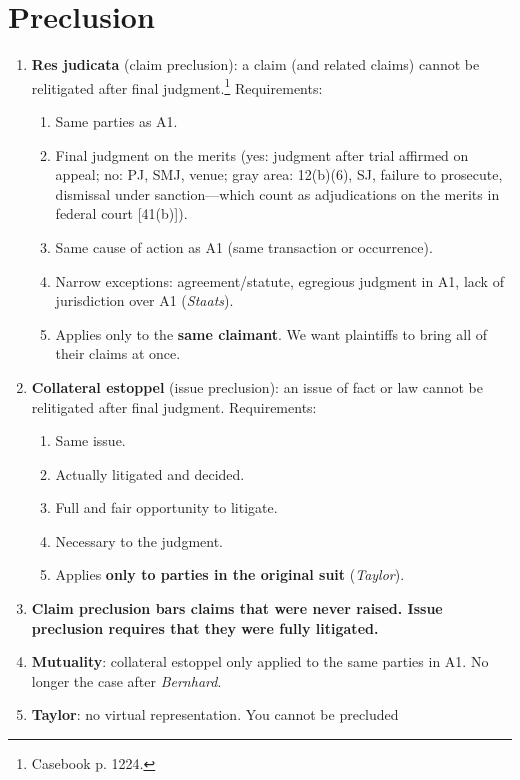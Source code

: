 \section{Preclusion}

\begin{enumerate}
    \item \textbf{Res judicata} (claim preclusion): a claim (and related 
    claims) cannot be relitigated after final judgment.\footnote{Casebook p.  
    1224.} Requirements:
    \begin{enumerate}
        \item Same parties as A1.
        \item Final judgment on the merits (yes: judgment after trial affirmed 
        on appeal; no: PJ, SMJ, venue; gray area: 12(b)(6), SJ, failure to 
        prosecute, dismissal under sanction---which count as adjudications on 
        the merits in federal court [41(b)]).
        \item Same cause of action as A1 (same transaction or occurrence).
        \item Narrow exceptions: agreement/statute, egregious judgment in A1, 
        lack of jurisdiction over A1 (\emph{Staats}).
        \item Applies only to the \textbf{same claimant}. We want plaintiffs 
        to bring all of their claims at once.
    \end{enumerate}
    \item \textbf{Collateral estoppel} (issue preclusion): an issue of fact or 
    law cannot be relitigated after final judgment. Requirements:
    \begin{enumerate}
        \item Same issue.
        \item Actually litigated and decided.
        \item Full and fair opportunity to litigate.
        \item Necessary to the judgment.
        \item Applies \textbf{only to parties in the original suit} 
        (\emph{Taylor}).
    \end{enumerate}
    \item \textbf{Claim preclusion bars claims that were never raised. Issue 
    preclusion requires that they were fully litigated.}
    \item \textbf{Mutuality}: collateral estoppel only applied to the same 
    parties in A1. No longer the case after \emph{Bernhard}.
    \item \textbf{Taylor}: no virtual representation. You cannot be precluded 

\end{enumerate}
